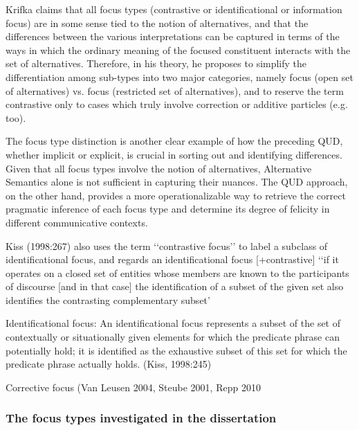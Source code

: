 \documentclass[12pt]{report}
\begin{document}
Krifka \cite{krifka2008basic} claims that all focus types (contrastive or identificational or information focus) are in some sense tied to the notion of alternatives, and that the differences between the various interpretations can be captured in terms of the ways in which the ordinary meaning of the focused constituent interacts with the set of alternatives. Therefore, in his theory, he proposes to simplify the differentiation among sub-types into  two major categories, namely  focus (open set of alternatives) vs.  focus (restricted set of alternatives), and to reserve the term contrastive only to cases which truly involve correction or additive particles (e.g. too).


The focus type distinction is another clear example of how the preceding QUD, whether implicit or explicit, is crucial in sorting out and identifying differences. Given that all focus types involve the notion of alternatives, Alternative Semantics alone is not sufficient in capturing their nuances. The QUD approach, on the other hand, provides a more operationalizable way to retrieve the correct pragmatic inference of each focus type and determine its degree of felicity in different communicative contexts.

Kiss (1998:267) also uses the term ‘‘contrastive focus’’ to label a subclass of identificational focus, and regards an identificational focus [+contrastive] ‘‘if it operates on a closed set of entities whose members are known to the participants of discourse [and in that case] the identification of a subset of the given set also identifies the contrasting complementary subset’

Identificational  focus:
An identificational focus represents a subset of the set of contextually or situationally given elements for which the predicate phrase can potentially hold; it is identified as the exhaustive subset of this set for which the predicate phrase actually holds.
(Kiss, 1998:245)

 Corrective focus (Van Leusen 2004, Steube 2001, Repp 2010
\subsubsection{The focus types investigated in the dissertation } \label{typesinvestigated}
\end{document}
